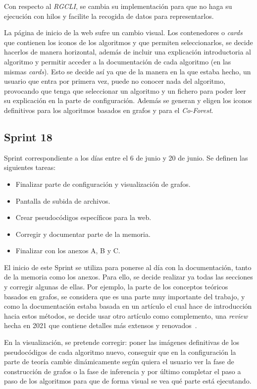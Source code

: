 Con respecto al \textit{RGCLI}, se cambia su implementación para que no haga su ejecución con hilos y facilite la recogida de datos para representarlos.

La página de inicio de la web sufre un cambio visual. Los contenedores o \textit{cards} que contienen los iconos de los algoritmos y que permiten seleccionarlos, se decide hacerlos de manera horizontal, además de incluir una explicación introductoria al algoritmo y permitir acceder a la documentación de cada algoritmo (en las mismas \textit{cards}). Esto se decide así ya que de la manera en la que estaba hecho, un usuario que entra por primera vez, puede no conocer nada del algoritmo, provocando que tenga que seleccionar un algoritmo y un fichero para poder leer su explicación en la parte de configuración. Además se generan y eligen los iconos definitivos para los algoritmos basados en grafos y para el \textit{Co-Forest}.


\subsection{Sprint 18}
Sprint correspondiente a los días entre el 6 de junio y 20 de junio. Se definen las siguientes tareas:
\begin{itemize}
	\item Finalizar parte de configuración y visualización de grafos.
	\item Pantalla de subida de archivos.
	\item Crear pseudocódigos específicos para la web.
	\item Corregir y documentar parte de la memoria.
	\item Finalizar con los anexos A, B y C.
\end{itemize}

El inicio de este Sprint se utiliza para ponerse al día con la documentación, tanto de la memoria como los anexos. Para ello, se decide realizar ya todas las secciones y corregir algunas de ellas. Por ejemplo, la parte de los conceptos teóricos basados en grafos, se considera que es una parte muy importante del trabajo, y como la documentación estaba basada en un artículo el cual hace de introducción hacia estos métodos, se decide usar otro artículo como complemento, una \textit{review} hecha en 2021 que contiene detalles más extensos y renovados~\cite{GSSL:review}.

En la visualización, se pretende corregir: poner las imágenes definitivas de los pseudocódigos de cada algoritmo nuevo, conseguir que en la configuración la parte de teoría cambie dinámicamente según quiera el usuario ver la fase de construcción de grafos o la fase de inferencia y por último completar el paso a paso de los algoritmos para que de forma visual se vea qué parte está ejecutando.


